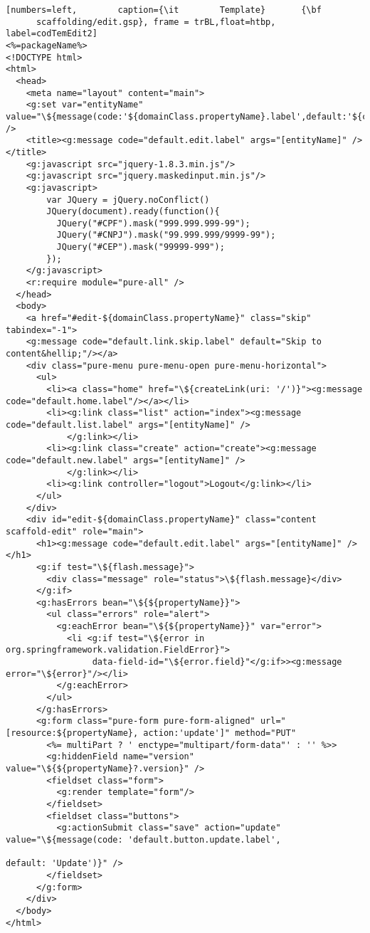 \begin{lstlisting}[numbers=left,        caption={\it        Template}       {\bf
      scaffolding/edit.gsp}, frame = trBL,float=htbp, label=codTemEdit2]
<%=packageName%>
<!DOCTYPE html>
<html>
  <head>
    <meta name="layout" content="main">
    <g:set var="entityName" value="\${message(code:'${domainClass.propertyName}.label',default:'${className}')}" />
    <title><g:message code="default.edit.label" args="[entityName]" /></title>
    <g:javascript src="jquery-1.8.3.min.js"/>
    <g:javascript src="jquery.maskedinput.min.js"/> 
    <g:javascript>
        var JQuery = jQuery.noConflict()
        JQuery(document).ready(function(){
          JQuery("#CPF").mask("999.999.999-99");
          JQuery("#CNPJ").mask("99.999.999/9999-99");
          JQuery("#CEP").mask("99999-999");
        });
    </g:javascript>
    <r:require module="pure-all" />
  </head>
  <body>
    <a href="#edit-${domainClass.propertyName}" class="skip" tabindex="-1">
    <g:message code="default.link.skip.label" default="Skip to content&hellip;"/></a>
    <div class="pure-menu pure-menu-open pure-menu-horizontal">
      <ul>
        <li><a class="home" href="\${createLink(uri: '/')}"><g:message code="default.home.label"/></a></li>
        <li><g:link class="list" action="index"><g:message code="default.list.label" args="[entityName]" />
            </g:link></li>
        <li><g:link class="create" action="create"><g:message code="default.new.label" args="[entityName]" />
            </g:link></li>
        <li><g:link controller="logout">Logout</g:link></li>
      </ul>
    </div>
    <div id="edit-${domainClass.propertyName}" class="content scaffold-edit" role="main">
      <h1><g:message code="default.edit.label" args="[entityName]" /></h1>
      <g:if test="\${flash.message}">
        <div class="message" role="status">\${flash.message}</div>
      </g:if>
      <g:hasErrors bean="\${${propertyName}}">
        <ul class="errors" role="alert">
          <g:eachError bean="\${${propertyName}}" var="error">
            <li <g:if test="\${error in org.springframework.validation.FieldError}">
                 data-field-id="\${error.field}"</g:if>><g:message error="\${error}"/></li>
          </g:eachError>
        </ul>
      </g:hasErrors>
      <g:form class="pure-form pure-form-aligned" url="[resource:${propertyName}, action:'update']" method="PUT" 
        <%= multiPart ? ' enctype="multipart/form-data"' : '' %>>
        <g:hiddenField name="version" value="\${${propertyName}?.version}" />
        <fieldset class="form">
          <g:render template="form"/>
        </fieldset>
        <fieldset class="buttons">
          <g:actionSubmit class="save" action="update" value="\${message(code: 'default.button.update.label', 
                                                                         default: 'Update')}" />
        </fieldset>
      </g:form>
    </div>
  </body>
</html>
\end{lstlisting}


